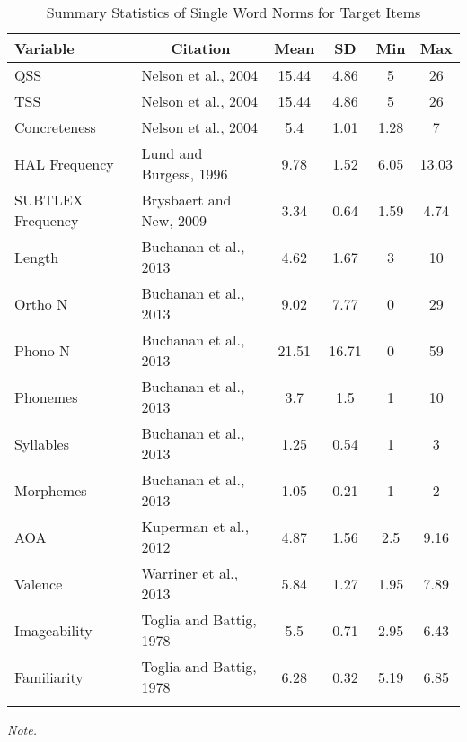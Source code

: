 \documentclass[english,man]{apa6}
\theoremstyle{definition}
\theoremstyle{definition}
\theoremstyle{definition}
\theoremstyle{remark}
\begin{document}
\begin{table}[tbp]
\begin{center}
\begin{threeparttable}
\caption{\label{tab:unnamed-chunk-3}Summary Statistics of Single Word Norms for Target Items}
\begin{tabular}{llcccc}
\toprule
Variable & \multicolumn{1}{c}{Citation} & \multicolumn{1}{c}{Mean} & \multicolumn{1}{c}{SD} & \multicolumn{1}{c}{Min} & \multicolumn{1}{c}{Max}\\
\midrule
QSS & Nelson et al., 2004 & 15.44 & 4.86 & 5 & 26\\
TSS & Nelson et al., 2004 & 15.44 & 4.86 & 5 & 26\\
Concreteness & Nelson et al., 2004 & 5.4 & 1.01 & 1.28 & 7\\
HAL Frequency & Lund and Burgess, 1996 & 9.78 & 1.52 & 6.05 & 13.03\\
SUBTLEX Frequency & Brysbaert and New, 2009 & 3.34 & 0.64 & 1.59 & 4.74\\
Length & Buchanan et al., 2013 & 4.62 & 1.67 & 3 & 10\\
Ortho N & Buchanan et al., 2013 & 9.02 & 7.77 & 0 & 29\\
Phono N & Buchanan et al., 2013 & 21.51 & 16.71 & 0 & 59\\
Phonemes & Buchanan et al., 2013 & 3.7 & 1.5 & 1 & 10\\
Syllables & Buchanan et al., 2013 & 1.25 & 0.54 & 1 & 3\\
Morphemes & Buchanan et al., 2013 & 1.05 & 0.21 & 1 & 2\\
AOA & Kuperman et al., 2012 & 4.87 & 1.56 & 2.5 & 9.16\\
Valence & Warriner et al., 2013 & 5.84 & 1.27 & 1.95 & 7.89\\
Imageability & Toglia and Battig, 1978 & 5.5 & 0.71 & 2.95 & 6.43\\
Familiarity & Toglia and Battig, 1978 & 6.28 & 0.32 & 5.19 & 6.85\\
\bottomrule
\addlinespace
\end{tabular}
\begin{tablenotes}[para]
\textit{Note.} 
\end{tablenotes}
\end{threeparttable}
\end{center}
\end{table}
\end{document}
